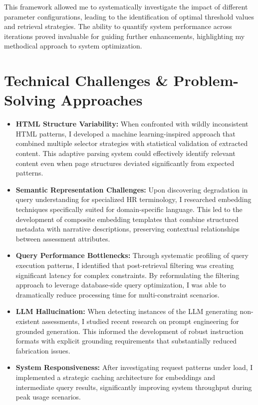 \documentclass[10pt,a4paper,twocolumn]{article}
\begin{document}
This framework allowed me to systematically investigate the impact of different parameter configurations, leading to the identification of optimal threshold values and retrieval strategies. The ability to quantify system performance across iterations proved invaluable for guiding further enhancements, highlighting my methodical approach to system optimization.

\section{Technical Challenges \& Problem-Solving Approaches}
\small
\begin{itemize}[leftmargin=*,itemsep=2pt,topsep=0pt,parsep=0pt]
    \item \textbf{HTML Structure Variability:} When confronted with wildly inconsistent HTML patterns, I developed a machine learning-inspired approach that combined multiple selector strategies with statistical validation of extracted content. This adaptive parsing system could effectively identify relevant content even when page structures deviated significantly from expected patterns.
    
    \item \textbf{Semantic Representation Challenges:} Upon discovering degradation in query understanding for specialized HR terminology, I researched embedding techniques specifically suited for domain-specific language. This led to the development of composite embedding templates that combine structured metadata with narrative descriptions, preserving contextual relationships between assessment attributes.
    
    \item \textbf{Query Performance Bottlenecks:} Through systematic profiling of query execution patterns, I identified that post-retrieval filtering was creating significant latency for complex constraints. By reformulating the filtering approach to leverage database-side query optimization, I was able to dramatically reduce processing time for multi-constraint scenarios.
    
    \item \textbf{LLM Hallucination:} When detecting instances of the LLM generating non-existent assessments, I studied recent research on prompt engineering for grounded generation. This informed the development of robust instruction formats with explicit grounding requirements that substantially reduced fabrication issues.
    
    \item \textbf{System Responsiveness:} After investigating request patterns under load, I implemented a strategic caching architecture for embeddings and intermediate query results, significantly improving system throughput during peak usage scenarios.
\end{itemize}
\end{document}
